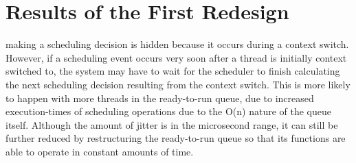 \section{Results of the First Redesign}
making a scheduling decision is hidden because it occurs during a context
switch.  However, if a scheduling event occurs very soon after a thread is
initially context switched to, the system may have to wait for the scheduler to
finish calculating the next scheduling decision resulting from the context
switch.  This is more likely to happen with more threads in the ready-to-run
queue, due to increased execution-times of scheduling operations due to the
O(n) nature of the queue itself.  Although the amount of jitter is in the
microsecond range, it can still be further reduced by restructuring the
ready-to-run queue so that its functions are able to operate in constant
amounts of time.
